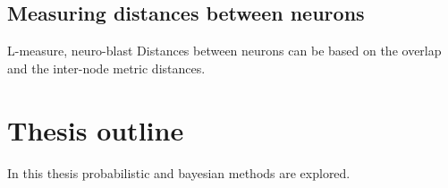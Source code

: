 
\subsection{Measuring distances between neurons}

L-measure, neuro-blast
Distances between neurons can be based on the overlap and the inter-node metric distances.

\section{Thesis outline}
In this thesis probabilistic and bayesian methods are explored.
